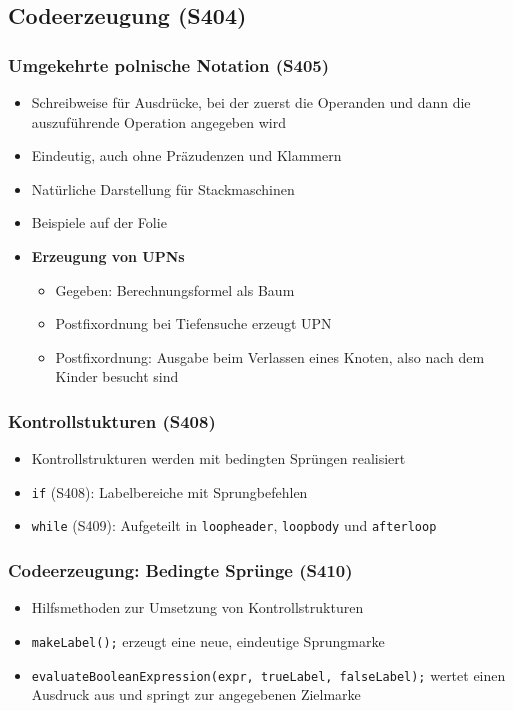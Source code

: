 \subsection{Codeerzeugung (S404)}

\subsubsection{Umgekehrte polnische Notation (S405)}
\begin{itemize}
	\item Schreibweise für Ausdrücke, bei der zuerst die Operanden und dann die auszuführende Operation angegeben wird
	\item Eindeutig, auch ohne Präzudenzen und Klammern
	\item Natürliche Darstellung für Stackmaschinen
	\item Beispiele auf der Folie
	\item \textbf{Erzeugung von UPNs}
	\begin{itemize}
		\item Gegeben: Berechnungsformel als Baum
		\item Postfixordnung bei Tiefensuche erzeugt UPN
		\item Postfixordnung: Ausgabe beim Verlassen eines Knoten, also nach dem Kinder besucht sind
	\end{itemize}
\end{itemize}

\subsubsection{Kontrollstukturen (S408)}
\begin{itemize}
	\item Kontrollstrukturen werden mit bedingten Sprüngen realisiert
	\item \texttt{if} (S408): Labelbereiche mit Sprungbefehlen
	\item \texttt{while} (S409): Aufgeteilt in \texttt{loopheader}, \texttt{loopbody} und \texttt{afterloop}
\end{itemize}

\subsubsection{Codeerzeugung: Bedingte Sprünge (S410)}
\begin{itemize}
	\item Hilfsmethoden zur Umsetzung von Kontrollstrukturen
	\item \texttt{makeLabel();} erzeugt eine neue, eindeutige Sprungmarke
	\item \texttt{evaluateBooleanExpression(expr, trueLabel, falseLabel);} wertet einen Ausdruck aus und springt zur angegebenen Zielmarke
\end{itemize}



